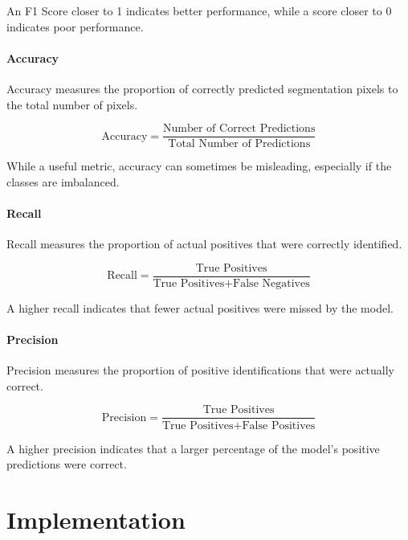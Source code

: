 \documentclass[11pt, a4paper,oneside,chapterprefix=false]{scrbook}
\begin{document}
An F1 Score closer to 1 indicates better performance, while a score closer to 0 indicates poor performance.

\subsubsection{Accuracy}

Accuracy measures the proportion of correctly predicted segmentation pixels to the total number of pixels.

\begin{equation}
	\text{Accuracy} = \frac{\text{Number of Correct Predictions}}{\text{Total Number of Predictions}}
\end{equation}

While a useful metric, accuracy can sometimes be misleading, especially if the classes are imbalanced.

\subsubsection{Recall}

Recall measures the proportion of actual positives that were correctly identified.

\begin{equation}
	\text{Recall} = \frac{\text{True Positives}}{\text{True Positives} + \text{False Negatives}}
\end{equation}

A higher recall indicates that fewer actual positives were missed by the model.

\subsubsection{Precision}

Precision measures the proportion of positive identifications that were actually correct.

\begin{equation}
	\text{Precision} = \frac{\text{True Positives}}{\text{True Positives} + \text{False Positives}}
\end{equation}

A higher precision indicates that a larger percentage of the model's positive predictions were correct.

\chapter{Implementation} \label{chp:implementation}
\end{document}
